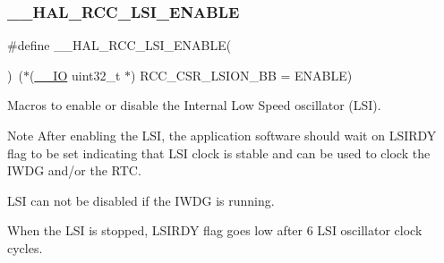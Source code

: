 \subsubsection{\texorpdfstring{\+\_\+\+\_\+\+H\+A\+L\+\_\+\+R\+C\+C\+\_\+\+L\+S\+I\+\_\+\+E\+N\+A\+B\+LE}{\_\_HAL\_RCC\_LSI\_ENABLE}}
{\footnotesize\ttfamily \#define \+\_\+\+\_\+\+H\+A\+L\+\_\+\+R\+C\+C\+\_\+\+L\+S\+I\+\_\+\+E\+N\+A\+B\+LE(\begin{DoxyParamCaption}{ }\end{DoxyParamCaption})~($\ast$(\hyperlink{core__sc300_8h_aec43007d9998a0a0e01faede4133d6be}{\+\_\+\+\_\+\+IO} uint32\+\_\+t $\ast$) R\+C\+C\+\_\+\+C\+S\+R\+\_\+\+L\+S\+I\+O\+N\+\_\+\+BB = E\+N\+A\+B\+LE)}



Macros to enable or disable the Internal Low Speed oscillator (L\+SI). 

\begin{DoxyNote}{Note}
After enabling the L\+SI, the application software should wait on L\+S\+I\+R\+DY flag to be set indicating that L\+SI clock is stable and can be used to clock the I\+W\+DG and/or the R\+TC. 

L\+SI can not be disabled if the I\+W\+DG is running. 

When the L\+SI is stopped, L\+S\+I\+R\+DY flag goes low after 6 L\+SI oscillator clock cycles. 
\end{DoxyNote}
